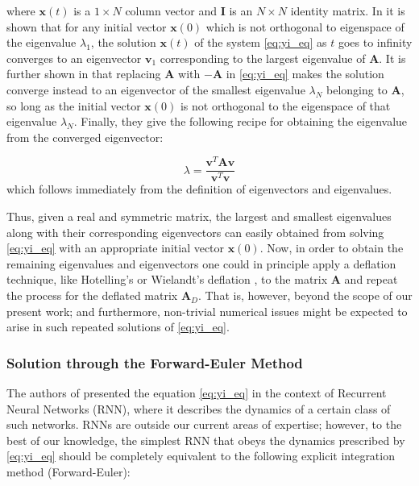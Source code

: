 \documentclass[reprint, english, nofootinbib]{revtex4-2}
\begin{document}
where $\mathbf{x}(t)$ is a $ 1 \times N$ column vector and $\mathbf{I}$ is an $N \times N$ identity matrix. In \cite{Yi_2004} it is shown that for any initial vector $\mathbf{x}(0)$ which is not orthogonal to eigenspace of the eigenvalue $\lambda_1$, the solution $\mathbf{x}(t)$ of the system \ref{eq:yi_eq} as $t$ goes to infinity converges to an eigenvector $\mathbf{v}_1$ corresponding to the largest eigenvalue of $\mathbf{A}$. It is further shown in \cite{Yi_2004} that replacing $\mathbf{A}$ with $\mathbf{-A}$ in \ref{eq:yi_eq} makes the solution converge instead to an eigenvector of the smallest eigenvalue $\lambda_N$ belonging to $\mathbf{A}$, so long as the initial vector $\mathbf{x}(0)$ is not orthogonal to the eigenspace of that eigenvalue $\lambda_N$. Finally, they give the following recipe for obtaining the eigenvalue from the converged eigenvector:

\begin{equation}
\label{eq:yi_eigenvalue}
\lambda = \frac{\mathbf{v}^T \mathbf{A} \mathbf{v}}{\mathbf{v}^T \mathbf{v}}
\end{equation}
which follows immediately from the definition of eigenvectors and eigenvalues.

Thus, given a real and symmetric matrix, the largest and smallest eigenvalues along with their corresponding eigenvectors can easily obtained from solving \ref{eq:yi_eq} with an appropriate initial vector $\mathbf{x}(0)$. Now, in order to obtain the remaining eigenvalues and eigenvectors one could in principle apply a deflation technique, like Hotelling's or Wielandt's deflation \cite{Saad_2011} \cite{Roberts}, to the matrix $\mathbf{A}$ and repeat the process for the deflated matrix $\mathbf{A}_D$. That is, however, beyond the scope of our present work; and furthermore, non-trivial numerical issues might be expected to arise in such repeated solutions of \ref{eq:yi_eq}.

\subsubsection{Solution through the Forward-Euler Method}

The authors of \cite{Yi_2004} presented the equation \ref{eq:yi_eq} in the context of Recurrent Neural Networks (RNN), where it describes the dynamics of a certain class of such networks. RNNs are outside our current areas of expertise; however, to the best of our knowledge, the simplest RNN that obeys the dynamics prescribed by \ref{eq:yi_eq} should be completely equivalent to the following explicit integration method (Forward-Euler):
\end{document}
